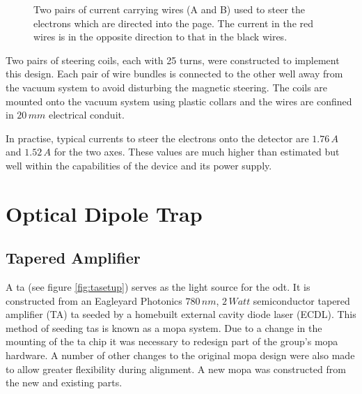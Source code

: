 \begin{figure}[h]
\centering
{}
\caption{Two pairs of current carrying wires (A and B) used to steer the electrons which are directed into the page. The current in the red wires is in the opposite direction to that in the black wires.}
\label{fig:mag_steering}
\end{figure}

Two pairs of steering coils, each with 25 turns, were constructed to implement this design. Each pair of wire bundles is connected to the other well away from the vacuum system to avoid disturbing the magnetic steering. The coils are mounted onto the vacuum system using plastic collars and the wires are confined in $20\,\unit{mm}$ electrical conduit.

In practise, typical currents to steer the electrons onto the detector are $1.76\,\unit{A}$ and $1.52\,\unit{A}$ for the two axes. These values are much higher than estimated but well within the capabilities of the device and its power supply.

\section{Optical Dipole Trap}

\subsection{Tapered Amplifier}
A \gls{ta} (see figure \ref{fig:tasetup}) serves as the light source for the \gls{odt}. It is constructed from an Eagleyard Photonics $780\,\unit{nm}$, $2\,\unit{Watt}$ semiconductor tapered amplifier (TA) \gls{ta} seeded by a homebuilt external cavity diode laser (ECDL). This method of seeding \glspl{ta} is known as a \gls{mopa} system\cite{wilson_narrow-linewidth_1998}. Due to a change in the mounting of the \gls{ta} chip it was necessary to redesign part of the group's \gls{mopa} hardware\cite{sheludko_shaped_2010}. A number of other changes to the original \gls{mopa} design were also made to allow greater flexibility during alignment. A new \gls{mopa} was constructed from the new and existing parts.

